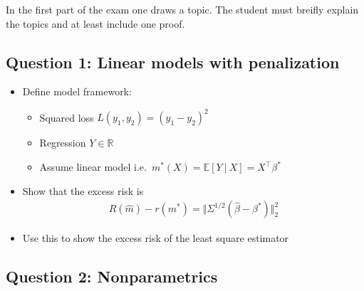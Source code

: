 \documentclass[
]{book}
\providecommand{\tightlist}{%
  \setlength{\itemsep}{0pt}\setlength{\parskip}{0pt}}
\begin{document}
In the first part of the exam one draws a topic. The student must breifly explain the topics and at least include one proof.

\hypertarget{question-1-linear-models-with-penalization}{%
\subsection{Question 1: Linear models with penalization}\label{question-1-linear-models-with-penalization}}

\begin{itemize}
\tightlist
\item
  Define model framework:

  \begin{itemize}
  \tightlist
  \item
    Squared loss \(L(y_1,y_2)=(y_1-y_2)^2\)
  \item
    Regression \(Y\in \mathbb R\)
  \item
    Assume linear model i.e.~\(m^*(X)=\mathbb E[Y\ \vert\ X]=X^\top \beta^*\)
  \end{itemize}
\item
  Show that the excess risk is
  \begin{align*}
    R(\hat m)-r(m^*)=\Vert \Sigma^{1/2}(\hat\beta - \beta^*)\Vert_2^2
    \end{align*}
\item
  Use this to show the excess risk of the least square estimator
\end{itemize}

\hypertarget{question-2-nonparametrics}{%
\subsection{Question 2: Nonparametrics}\label{question-2-nonparametrics}}
\end{document}
